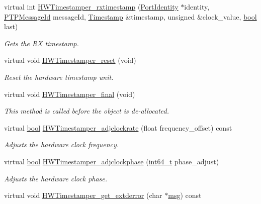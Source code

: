 \begin{DoxyCompactItemize}
virtual int \hyperlink{class_windows_ether_timestamper_a9dc0ab7dd51322bf334ba8fe1d4e77a9}{H\+W\+Timestamper\+\_\+rxtimestamp} (\hyperlink{class_port_identity}{Port\+Identity} $\ast$identity, \hyperlink{class_p_t_p_message_id}{P\+T\+P\+Message\+Id} message\+Id, \hyperlink{class_timestamp}{Timestamp} \&timestamp, unsigned \&clock\+\_\+value, \hyperlink{avb__gptp_8h_af6a258d8f3ee5206d682d799316314b1}{bool} last)
\begin{DoxyCompactList}\small\item\em Gets the RX timestamp. \end{DoxyCompactList}\item 
virtual void \hyperlink{class_common_timestamper_a1ee6bfcaf63bef07bbed1306e52e7203}{H\+W\+Timestamper\+\_\+reset} (void)
\begin{DoxyCompactList}\small\item\em Reset the hardware timestamp unit. \end{DoxyCompactList}\item 
virtual void \hyperlink{class_common_timestamper_a866fc2519a7b2a696e350ed05df53f90}{H\+W\+Timestamper\+\_\+final} (void)
\begin{DoxyCompactList}\small\item\em This method is called before the object is de-\/allocated. \end{DoxyCompactList}\item 
virtual \hyperlink{avb__gptp_8h_af6a258d8f3ee5206d682d799316314b1}{bool} \hyperlink{class_common_timestamper_a557b905a4f8bb20481c28c8dd33cfb21}{H\+W\+Timestamper\+\_\+adjclockrate} (float frequency\+\_\+offset) const 
\begin{DoxyCompactList}\small\item\em Adjusts the hardware clock frequency. \end{DoxyCompactList}\item 
virtual \hyperlink{avb__gptp_8h_af6a258d8f3ee5206d682d799316314b1}{bool} \hyperlink{class_common_timestamper_aa9470ea1623c3718913fbff1c55e3115}{H\+W\+Timestamper\+\_\+adjclockphase} (\hyperlink{parse_8c_a67a9885ef4908cb72ce26d75b694386c}{int64\+\_\+t} phase\+\_\+adjust)
\begin{DoxyCompactList}\small\item\em Adjusts the hardware clock phase. \end{DoxyCompactList}\item 
virtual void \hyperlink{class_common_timestamper_a3b26113436dec73775d2cbc523a6e074}{H\+W\+Timestamper\+\_\+get\+\_\+extderror} (char $\ast$\hyperlink{openavb__log_8c_a0c7e58a50354c4a4d6dad428d0e47029}{msg}) const 

\end{DoxyCompactItemize}
